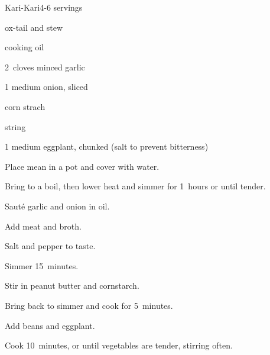 \begin{recipe}{Kari-Kari}{}{4-6 servings}

\begin{ingredients}
\item \lbs{2 \half} ox-tail and stew 
\item {} cooking oil
\item 2~cloves minced garlic
\item 1 medium onion, sliced
\item {} 
\item {} corn strach
\item \lbs{\half} string 
\item 1 medium eggplant, chunked (salt to prevent bitterness)
\end{ingredients}

\begin{directions}
\item Place mean in a pot and cover with water.
\item Bring to a boil, then lower heat and simmer for 1\half~hours or until tender.
\item Saut\'e garlic and onion in oil.
\item Add meat and broth.
\item Salt and pepper to taste.
\item Simmer 15~minutes.
\item Stir in peanut butter and cornstarch.
\item Bring back to simmer and cook for 5~minutes.
\item Add beans and eggplant.
\item Cook 10~minutes, or until vegetables are tender, stirring often.

\end{directions}
\end{recipe}
